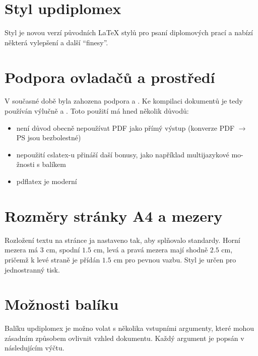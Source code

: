 \documentclass[a4paper,12pt]{article}
\begin{document}
\upmaketitle

\upthanksanot

\uptocandlists

\section{Styl updiplomex}
Styl  je novou verzí původních \LaTeX{} stylů pro psaní diplomových prací a nabízí některá vylepšení a další \enquote{finesy}.

\section{Podpora ovladačů a prostředí}
V současné době byla zahozena podpora  a . Ke kompilaci dokumentů je tedy používán výlučně  a . Toto použití má hned několik důvodů:
\begin{itemize}
\item není důvod obecně nepoužívat PDF jako přímý výstup (konverze PDF $\rightarrow$ PS jsou bezbolestné)
\item nepoužití cslatex-u přináší daší bonusy, jako například multijazykové mo-žnosti s balíkem 
\item pdflatex je moderní
\end{itemize}

\section{Rozměry stránky A4 a mezery}
Rozložení textu na stránce ja nastaveno tak, aby splňovalo standardy. Horní mezera má $3$ cm, spodní $1.5$ cm, levá a pravá mezera mají shodně $2.5$ cm, pričemž k levé straně je přídán $1.5$ cm pro pevnou vazbu. Styl je určen pro jednostranný tisk.

\section{Možnosti balíku}
Balíku updiplomex je možno volat s několika vstupními argumenty, které mohou zásadním způsobem ovlivnit vzhled dokumentu. Každý argument je popsán v následujícím výčtu.
\end{document}
